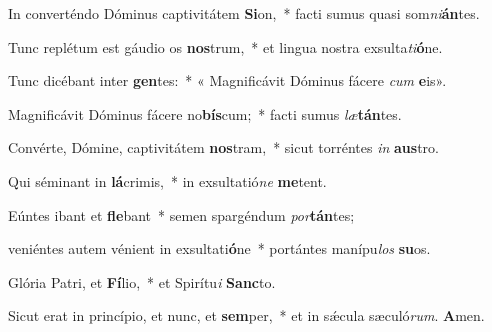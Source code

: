\item In converténdo Dóminus captivitátem \textbf{Si}on,~* facti sumus quasi som\textit{ni}\textbf{án}tes.

\item Tunc replétum est gáudio os \textbf{nos}trum,~* et lingua nostra exsulta\textit{ti}\textbf{ó}ne.

\item Tunc dicébant inter \textbf{gen}tes:~* « Magnificávit Dóminus fácere \textit{cum} \textbf{e}is».

\item Magnificávit Dóminus fácere no\textbf{bís}cum;~* facti sumus \textit{læ}\textbf{tán}tes.

\item Convérte, Dómine, captivitátem \textbf{nos}tram,~* sicut torréntes \textit{in} \textbf{aus}tro.

\item Qui séminant in \textbf{lá}crimis,~* in exsultatió\textit{ne} \textbf{me}tent.

\item Eúntes ibant et \textbf{fle}bant~* semen spargéndum \textit{por}\textbf{tán}tes;

\item veniéntes autem vénient in exsultati\textbf{ó}ne~* portántes manípu\textit{los} \textbf{su}os.

\item Glória Patri, et \textbf{Fí}lio,~* et Spirítu\textit{i} \textbf{Sanc}to.

\item Sicut erat in princípio, et nunc, et \textbf{sem}per,~* et in sǽcula sæculó\textit{rum}. \textbf{A}men.